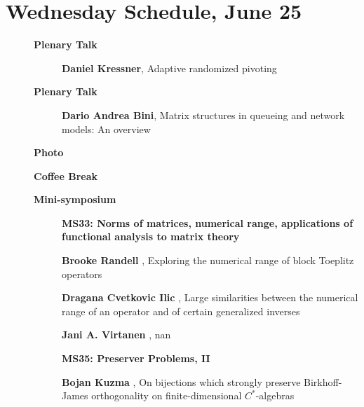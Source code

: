 \documentclass[ILAS2025-program.tex]{subfiles}
\begin{document}
\section{Wednesday Schedule, June 25}
    
    \begin{description}
    \item[] \textbf{Plenary Talk} 
    \begin{description}
        \item[] \textbf{Daniel Kressner}, Adaptive randomized pivoting
        \end{description}
        \item[] \textbf{Plenary Talk} 
    \begin{description}
        \item[] \textbf{Dario Andrea Bini}, Matrix structures in queueing and network models: An overview
        \end{description}
        \item[] \textbf{Photo} 
    \item[] \textbf{Coffee Break} 
    \item[] \textbf{Mini-symposium} 
    \begin{description}
    \item[] {\color{mstitle}\textbf{MS33: Norms of matrices, numerical range, applications of functional analysis to matrix theory}} 
    \item[] \textbf{Brooke Randell} , Exploring the numerical range of block Toeplitz operators
        \item[] \textbf{Dragana Cvetkovic Ilic} , Large similarities between the numerical range of an operator and
of certain generalized inverses
        \item[] \textbf{Jani A. Virtanen} , nan
        \end{description}
    \begin{description}
    \item[] {\color{mstitle}\textbf{MS35: Preserver Problems, II}} 
    \item[] \textbf{Bojan Kuzma} , On bijections which strongly preserve Birkhoff-James orthogonality on finite-dimensional $C^*$-algebras

\end{description}
\end{description}
\end{document}
